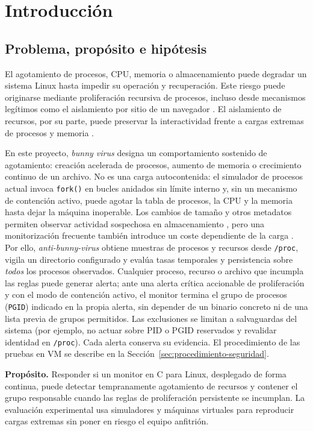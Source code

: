 \chapter{Introducción}

\section{Problema, propósito e hipótesis}

El agotamiento de procesos, CPU, memoria o almacenamiento puede degradar un
sistema Linux hasta impedir su operación y recuperación. Este riesgo puede
originarse mediante proliferación recursiva de procesos, incluso desde
mecanismos legítimos como el aislamiento por sitio de un navegador
\cite{gierlings2023isolated}. El aislamiento de recursos, por su parte, puede
preservar la interactividad frente a cargas extremas de procesos y memoria
\cite{yang2008redline}.

En este proyecto, \emph{bunny virus} designa un comportamiento sostenido de
agotamiento: creación acelerada de procesos, aumento de memoria o crecimiento
continuo de un archivo. No es una carga autocontenida: el simulador de procesos
actual invoca \texttt{fork()} en bucles anidados sin límite interno y, sin un
mecanismo de contención activo, puede agotar la tabla de procesos, la CPU y la
memoria hasta dejar la máquina inoperable. Los cambios de tamaño y otros
metadatos permiten observar actividad sospechosa en almacenamiento
\cite{pennington2003storage}, pero una monitorización frecuente también introduce
un coste dependiente de la carga \cite{patil2004i3fs}. Por ello,
\emph{anti-bunny-virus} obtiene muestras de procesos y recursos desde
\texttt{/proc}, vigila un directorio configurado y evalúa tasas temporales y
persistencia sobre \emph{todos} los procesos observados. Cualquier proceso,
recurso o archivo que incumpla las reglas puede generar alerta; ante una alerta
crítica accionable de proliferación y con el modo de contención activo, el monitor
termina el grupo de procesos (\texttt{PGID}) indicado en la propia alerta, sin
depender de un binario concreto ni de una lista previa de grupos permitidos.
Las exclusiones se limitan a salvaguardas del sistema (por ejemplo, no actuar
sobre PID o PGID reservados y revalidar identidad en \texttt{/proc}). Cada
alerta conserva su evidencia. El procedimiento de las pruebas en VM se describe
en la Sección~\ref{sec:procedimiento-seguridad}.

\textbf{Propósito.} Responder si un monitor en C para Linux, desplegado de forma
continua, puede detectar tempranamente agotamiento de recursos y contener el
grupo responsable cuando las reglas de proliferación persistente se incumplan.
La evaluación experimental usa simuladores y máquinas virtuales para reproducir
cargas extremas sin poner en riesgo el equipo anfitrión.

